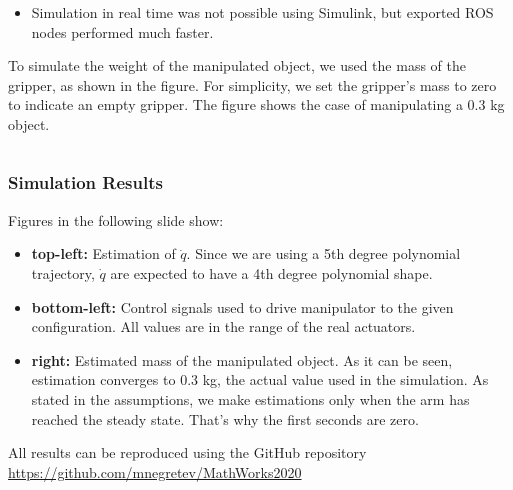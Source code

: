 \documentclass[9pt,spanish,aspectratio=1610]{beamer}
\begin{document}
\begin{frame}
\begin{columns}
\begin{column}{0.55\textwidth}
\begin{itemize}
      \item Simulation in real time was not possible using Simulink, but exported ROS nodes performed much faster. 
      \end{itemize}
      To simulate the weight of the manipulated object, we used the mass of the gripper, as shown in the figure. For simplicity, we set the gripper's mass to zero to indicate an empty gripper. The figure shows the case of manipulating a 0.3 kg object.
    \end{column}
  \end{columns}
\end{frame}

\begin{frame}\frametitle{Simulation Results}
  Figures in the following slide show:
  \begin{itemize}
  \item \textbf{top-left:} Estimation of $\dot{q}$. Since we are using a 5th degree polynomial trajectory, $\dot{q}$ are expected to have a 4th degree polynomial shape.
  \item \textbf{bottom-left:} Control signals used to drive manipulator to the given configuration. All values are in the range of the real actuators.
  \item \textbf{right:} Estimated mass of the manipulated object. As it can be seen, estimation converges to 0.3 kg, the actual value used in the simulation. As stated in the assumptions, we make estimations only when the arm has reached the steady state. That's why the first seconds are zero. 
  \end{itemize}

  All results can be reproduced using the GitHub repository \url{https://github.com/mnegretev/MathWorks2020}
\end{frame}
\end{document}
